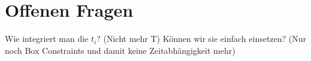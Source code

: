 \documentclass[12pt,a4paper]{article}
\theoremstyle{definition}
\theoremstyle{plain}
\begin{document}
\section{Offenen Fragen}
Wie integriert man die $t_i$? (Nicht mehr T)
Können wir sie einfach einsetzen? (Nur noch Box Constraints und damit keine Zeitabhängigkeit mehr)
\end{document}
